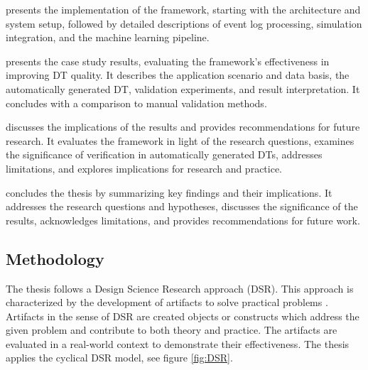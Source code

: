  presents the implementation of the framework, starting with the architecture and system setup, followed by detailed descriptions of event log processing, simulation integration, and the machine learning pipeline.

 presents the case study results, evaluating the framework's effectiveness in improving DT quality. It describes the application scenario and data basis, the automatically generated DT, validation experiments, and result interpretation. It concludes with a comparison to manual validation methods.

 discusses the implications of the results and provides recommendations for future research. It evaluates the framework in light of the research questions, examines the significance of verification in automatically generated DTs, addresses limitations, and explores implications for research and practice.

 concludes the thesis by summarizing key findings and their implications. It addresses the research questions and hypotheses, discusses the significance of the results, acknowledges limitations, and provides recommendations for future work.

\subsection*{Methodology}

The thesis follows a Design Science Research approach (DSR). This approach is characterized by the development of artifacts to solve practical problems \autocite{hevner2004design,peffers2007design}. Artifacts in the sense of DSR are created objects or constructs which address the given problem and contribute to both theory and practice. The artifacts are evaluated in a real-world context to demonstrate their effectiveness. The thesis applies the cyclical DSR model, see figure \ref{fig:DSR}.

